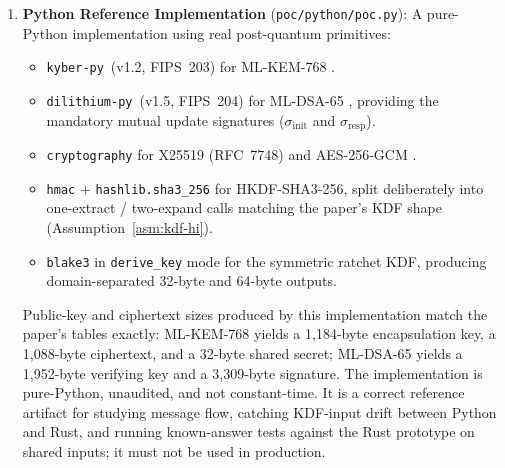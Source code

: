 \documentclass[11pt,a4paper]{article}
\theoremstyle{remark}
\theoremstyle{plain}
\begin{document}
\begin{enumerate}
  \item \textbf{Python Reference Implementation} (\texttt{poc/python/poc.py}): A pure-Python
        implementation using real post-quantum primitives:
        \begin{itemize}
          \item \texttt{kyber-py}~(v1.2, FIPS~203) for ML-KEM-768 \cite{nist_fips203}.
          \item \texttt{dilithium-py}~(v1.5, FIPS~204) for ML-DSA-65 \cite{nist_fips204},
                providing the mandatory mutual update signatures ($\sigma_{\mathrm{init}}$
                and $\sigma_{\mathrm{resp}}$).
          \item \texttt{cryptography} for X25519 (RFC~7748) and AES-256-GCM \cite{rfc7748}.
          \item \texttt{hmac} $+$ \texttt{hashlib.sha3\_256} for HKDF-SHA3-256, split
                deliberately into one-extract / two-expand calls matching the paper's
                KDF shape (Assumption~\ref{asm:kdf-hi}).
          \item \texttt{blake3} in \texttt{derive\_key} mode for the symmetric ratchet
                KDF, producing domain-separated 32-byte and 64-byte outputs.
        \end{itemize}
        Public-key and ciphertext sizes produced by this implementation match the
        paper's tables exactly: ML-KEM-768 yields a 1{,}184-byte encapsulation key,
        a 1{,}088-byte ciphertext, and a 32-byte shared secret; ML-DSA-65 yields a
        1{,}952-byte verifying key and a 3{,}309-byte signature.
        The implementation is pure-Python, unaudited, and not constant-time.  It is
        a correct reference artifact for studying message flow, catching KDF-input
        drift between Python and Rust, and running known-answer tests against the
        Rust prototype on shared inputs; it must not be used in production.


\end{enumerate}
\end{document}
